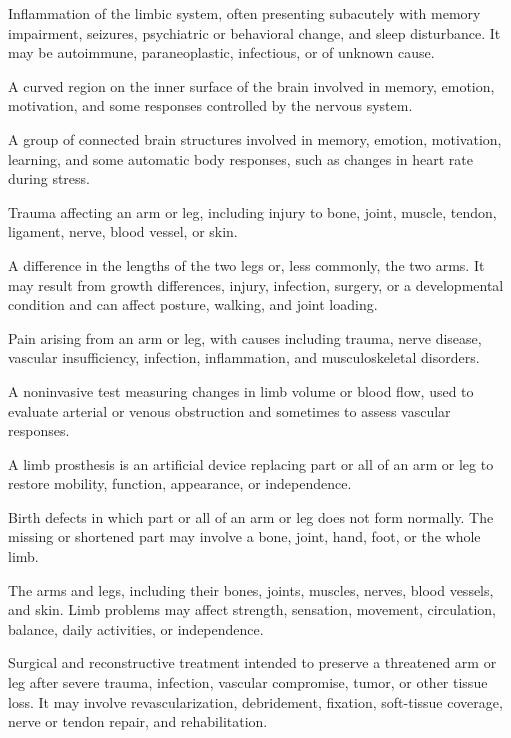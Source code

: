  Inflammation of the limbic system, often presenting subacutely with memory impairment,
seizures, psychiatric or behavioral change, and sleep disturbance. It may be autoimmune,
paraneoplastic, infectious, or of unknown cause.

 A curved region on the inner surface of the brain involved in memory, emotion, motivation, and some responses controlled by the nervous system.

 A group of connected brain structures involved in memory, emotion, motivation, learning, and some automatic body responses, such as changes in heart rate during stress.

 Trauma affecting an arm or leg, including injury to bone, joint, muscle, tendon, ligament, nerve, blood vessel, or skin.

 A difference in the lengths of the two legs or, less commonly, the two arms. It may result from growth differences, injury, infection, surgery, or a developmental condition and can affect posture, walking, and joint loading.

 Pain arising from an arm or leg, with causes including trauma, nerve disease, vascular insufficiency, infection, inflammation, and musculoskeletal disorders.

 A noninvasive test measuring changes in limb volume or blood flow, used to evaluate arterial or venous obstruction and sometimes to assess vascular responses.

 A limb prosthesis is an artificial device replacing part or all of an arm or leg to restore mobility, function, appearance, or independence.

 Birth defects in which part or all of an arm or
leg does not form normally. The missing or shortened part may involve a bone,
joint, hand, foot, or the whole limb.

 The arms and legs, including their bones, joints, muscles, nerves, blood vessels, and skin. Limb problems may affect strength, sensation, movement, circulation, balance, daily activities, or independence.

 Surgical and reconstructive treatment intended to preserve a threatened arm or leg after severe trauma, infection, vascular compromise, tumor, or other tissue loss. It may involve revascularization, debridement, fixation, soft-tissue coverage, nerve or tendon repair, and rehabilitation.

